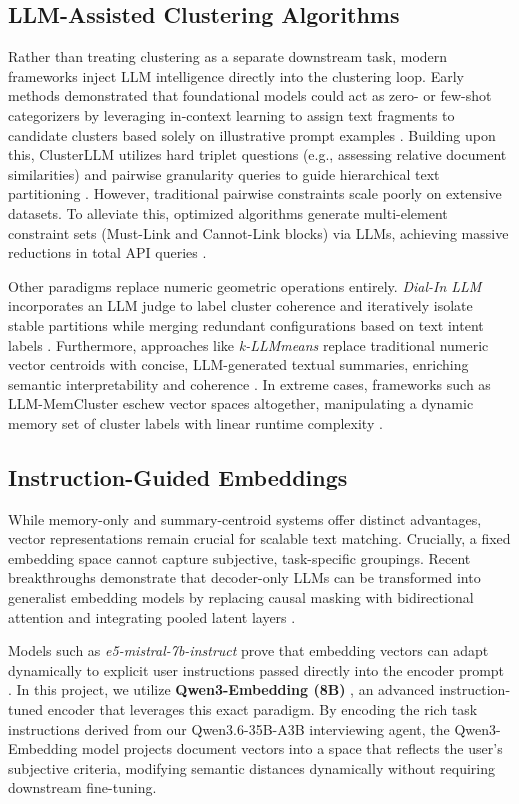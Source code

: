 \subsection{LLM-Assisted Clustering Algorithms}
Rather than treating clustering as a separate downstream task, modern frameworks inject LLM intelligence directly into the clustering loop. 
Early methods demonstrated that foundational models could act as zero- or few-shot categorizers by leveraging in-context learning to assign text fragments to candidate clusters based solely on illustrative prompt examples \cite{few_shot_clustering}. Building upon this, ClusterLLM utilizes hard triplet questions (e.g., assessing relative document similarities) and pairwise granularity queries to guide hierarchical text partitioning \cite{clusterllm}. However, traditional pairwise constraints scale poorly on extensive datasets. To alleviate this, optimized algorithms generate multi-element constraint sets (Must-Link and Cannot-Link blocks) via LLMs, achieving massive reductions in total API queries \cite{optimized_algorithms}.

Other paradigms replace numeric geometric operations entirely. 
\textit{Dial-In LLM} incorporates an LLM judge to label cluster coherence and iteratively isolate stable partitions while merging redundant configurations based on text intent labels \cite{dial_in_llm}. 
Furthermore, approaches like \textit{k-LLMmeans} replace traditional numeric vector centroids with concise, LLM-generated textual summaries, enriching semantic interpretability and coherence \cite{summaries_as_centroids}. 
In extreme cases, frameworks such as LLM-MemCluster eschew vector spaces altogether, manipulating a dynamic memory set of cluster labels with linear runtime complexity \cite{llm_memcluster}. 

\subsection{Instruction-Guided Embeddings}
While memory-only and summary-centroid systems offer distinct advantages, vector representations remain crucial for scalable text matching. 
Crucially, a fixed embedding space cannot capture subjective, task-specific groupings. 
Recent breakthroughs demonstrate that decoder-only LLMs can be transformed into generalist embedding models by replacing causal masking with bidirectional attention and integrating pooled latent layers \cite{nv_embed}. 

Models such as \textit{e5-mistral-7b-instruct} prove that embedding vectors can adapt dynamically to explicit user instructions passed directly into the encoder prompt \cite{improving_text_embeddings}. In this project, we utilize \textbf{Qwen3-Embedding (8B)} \cite{qwen3_embedding}, an advanced instruction-tuned encoder that leverages this exact paradigm. By encoding the rich task instructions derived from our Qwen3.6-35B-A3B interviewing agent, the Qwen3-Embedding model projects document vectors into a space that reflects the user's subjective criteria, modifying semantic distances dynamically without requiring downstream fine-tuning.

